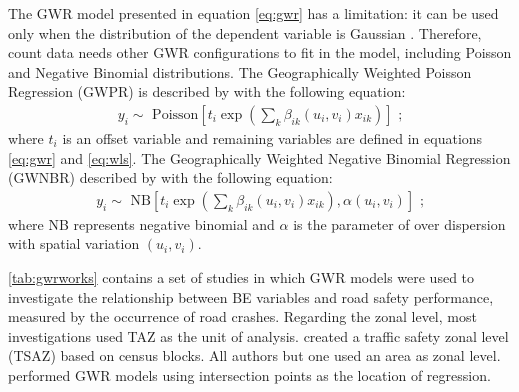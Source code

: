 The GWR model presented in equation \ref{eq:gwr} has a limitation: it can be used only when the distribution of the dependent variable is Gaussian \cite{DaSilva2013a}. Therefore, count data needs other GWR configurations to fit in the model, including Poisson and Negative Binomial distributions. The Geographically Weighted Poisson Regression (GWPR) is described by \textcite{Obelheiro2020,Nakaya2005a} with the following equation: \begin{align}
    y_i \sim \mbox{ Poisson} \left[t_i \exp \left(\sum_k \beta_{ik} \left( u_{i}, v_{i} \right) x_{ik} \right) \right] \mbox{ ;}
\end{align} where $t_i$ is an offset variable and remaining variables are defined in equations \ref{eq:gwr} and \ref{eq:wls}. The Geographically Weighted Negative Binomial Regression (GWNBR) described by \textcite{DaSilva2013a} with the following equation: \begin{align}
    y_i \sim \mbox{ NB} \left[t_i \exp \left( \sum_k \beta_{ik} \left( u_{i}, v_{i} \right) x_{ik} \right), \alpha \left( u_{i}, v_{i}\right) \right] \mbox{ ;}
\end{align} where NB represents negative binomial and $\alpha$ is the parameter of over dispersion with spatial variation $\left(u_i, v_i\right)$. 

\autoref{tab:gwrworks} contains a set of studies in which GWR models were used to investigate the relationship between BE variables and road safety performance, measured by the occurrence of road crashes. Regarding the zonal level, most investigations used TAZ as the unit of analysis. \textcite{Obelheiro2020} created a traffic safety zonal level (TSAZ) based on census blocks. All authors but one used an area as zonal level. \textcite{Arvin2019} performed GWR models using intersection points as the location of regression. 

